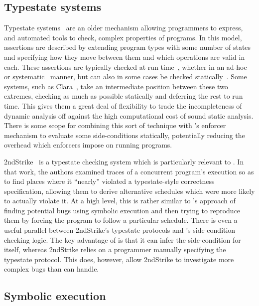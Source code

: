 \subsection{Typestate systems}

Typestate systems~\cite{Strom1986a} are an older mechanism allowing
programmers to express, and automated tools to check, complex
properties of programs.  In this model, assertions are described by
extending program types with some number of states and specifying how
they move between them and which operations are valid in each.  These
assertions are typically checked at run time~\cite{FFFWolff2011},
whether in an ad-hoc~\cite[pages~305--314]{Gamma1995} or
systematic~\cite{Aldrich2009} manner, but can also in some cases be
checked statically~\cite{Lam2005}.  Some systems, such as
Clara~\cite{FFFBodden2010}, take an intermediate position between these
two extremes, checking as much as possible statically and deferring
the rest to run time.  This gives them a great deal of flexibility to
trade the incompleteness of dynamic analysis off against the high
computational cost of sound static analysis.  There is some scope for
combining this sort of technique with {\technique}'s enforcer
mechanism to evaluate some side-conditions statically, potentially
reducing the overhead which enforcers impose on running programs.

2ndStrike~\cite{Gao2011} is a typestate checking system which is
particularly relevant to {\technique}.  In that work, the authors
examined traces of a concurrent program's execution so as to find
places where it ``nearly'' violated a typestate-style correctness
specification, allowing them to derive alternative schedules which
were more likely to actually violate it.  At a high level, this is
rather similar to {\technique}'s approach of finding potential bugs
using symbolic execution and then trying to reproduce them by forcing
the program to follow a particular schedule.  There is even a useful
parallel between 2ndStrike's typestate protocols and {\technique}'s
side-condition checking logic.  The key advantage of {\technique} is
that it can infer the side-condition for itself, whereas 2ndStrike
relies on a programmer manually specifying the typestate protocol.
This does, however, allow 2ndStrike to investigate more complex bugs
than {\technique} can handle.

\subsection{Symbolic execution}


